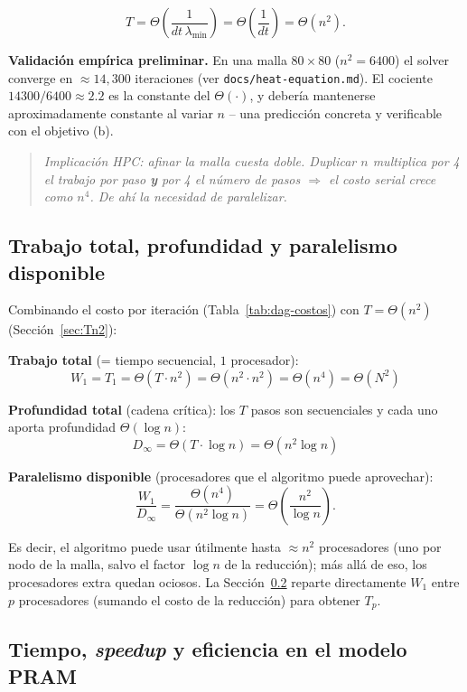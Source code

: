 \documentclass[11pt,a4paper]{article}
\begin{document}
	\[
	T = \Theta\!\left(\frac{1}{dt\,\lambda_{\min}}\right) = \Theta\!\left(\frac{1}{dt}\right)
	= \Theta(n^2).
	\]

	\textbf{Validación empírica preliminar.} En una malla $80\times80$
	($n^2=6400$) el solver converge en $\approx14{,}300$ iteraciones (ver
	\texttt{docs/heat-equation.md}). El cociente $14300/6400\approx2.2$ es la
	constante del $\Theta(\cdot)$, y debería mantenerse aproximadamente constante al
	variar $n$ -- una predicción concreta y verificable con el objetivo (b).

	\begin{quote}
	\small\textit{Implicación HPC: afinar la malla cuesta doble. Duplicar $n$
	multiplica por 4 el trabajo por paso \textbf{y} por 4 el número de pasos
	$\Rightarrow$ el costo serial crece como $n^4$. De ahí la necesidad de
	paralelizar.}
	\end{quote}

	\subsection{Trabajo total, profundidad y paralelismo disponible}
	\label{sec:brent}

	Combinando el costo por iteración (Tabla~\ref{tab:dag-costos}) con
	$T=\Theta(n^2)$ (Sección~\ref{sec:Tn2}):

	\textbf{Trabajo total} (= tiempo secuencial, $1$ procesador):
	\[
	\boxed{W_1 = T_1 = \Theta(T\cdot n^2) = \Theta(n^2\cdot n^2) = \Theta(n^4) = \Theta(N^2)}
	\]

	\textbf{Profundidad total} (cadena crítica): los $T$ pasos son secuenciales y cada
	uno aporta profundidad $\Theta(\log n)$:
	\[
	\boxed{D_\infty = \Theta(T\cdot\log n) = \Theta(n^2\log n)}
	\]

	\textbf{Paralelismo disponible} (procesadores que el algoritmo puede aprovechar):
	\[
	\frac{W_1}{D_\infty} = \frac{\Theta(n^4)}{\Theta(n^2\log n)} = \Theta\!\left(\frac{n^2}{\log n}\right).
	\]

	Es decir, el algoritmo puede usar útilmente hasta $\approx n^2$ procesadores (uno
	por nodo de la malla, salvo el factor $\log n$ de la reducción); más allá de eso,
	los procesadores extra quedan ociosos. La Sección~\ref{sec:pram-metricas}
	reparte directamente $W_1$ entre $p$ procesadores (sumando el costo de la
	reducción) para obtener $T_p$.

	\subsection{Tiempo, \textit{speedup} y eficiencia en el modelo PRAM}
	\label{sec:pram-metricas}
\end{document}
